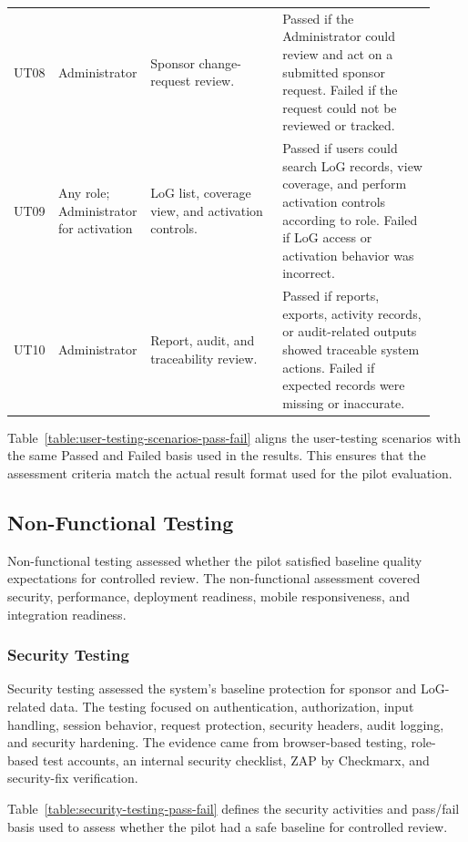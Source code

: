 \begin{longtable}{>{\raggedright\arraybackslash}p{0.08\linewidth}
>{\raggedright\arraybackslash}p{0.17\linewidth}
>{\raggedright\arraybackslash}p{0.31\linewidth}
>{\raggedright\arraybackslash}p{0.36\linewidth}}
UT08 & Administrator & Sponsor change-request review. & Passed if the Administrator could review and act on a submitted sponsor request. Failed if the request could not be reviewed or tracked. \\
UT09 & Any role; Administrator for activation & LoG list, coverage view, and activation controls. & Passed if users could search LoG records, view coverage, and perform activation controls according to role. Failed if LoG access or activation behavior was incorrect. \\
UT10 & Administrator & Report, audit, and traceability review. & Passed if reports, exports, activity records, or audit-related outputs showed traceable system actions. Failed if expected records were missing or inaccurate. \\
\end{longtable}

Table~\ref{table:user-testing-scenarios-pass-fail} aligns the user-testing scenarios with the same Passed and Failed basis used in the results. This ensures that the assessment criteria match the actual result format used for the pilot evaluation.

\subsection{Non-Functional Testing}

Non-functional testing assessed whether the pilot satisfied baseline quality expectations for controlled review. The non-functional assessment covered security, performance, deployment readiness, mobile responsiveness, and integration readiness.

\subsubsection{Security Testing}

Security testing assessed the system's baseline protection for sponsor and LoG-related data. The testing focused on authentication, authorization, input handling, session behavior, request protection, security headers, audit logging, and security hardening. The evidence came from browser-based testing, role-based test accounts, an internal security checklist, ZAP by Checkmarx, and security-fix verification.

\setlength{\LTleft}{0pt}
\setlength{\LTright}{\fill}
Table~\ref{table:security-testing-pass-fail} defines the security activities and pass/fail basis used to assess whether the pilot had a safe baseline for controlled review.

